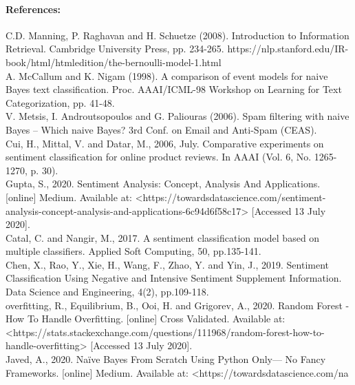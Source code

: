 \documentclass[12pt]{report}
\begin{document}
	
	\paragraph{References:}
	C.D. Manning, P. Raghavan and H. Schuetze (2008). Introduction to Information Retrieval. Cambridge University Press, pp. 234-265. https://nlp.stanford.edu/IR-book/html/htmledition/the-bernoulli-model-1.html\\
	
	A. McCallum and K. Nigam (1998). A comparison of event models for naive Bayes text classification. Proc. AAAI/ICML-98 Workshop on Learning for Text Categorization, pp. 41-48.\\
	
	V. Metsis, I. Androutsopoulos and G. Paliouras (2006). Spam filtering with naive Bayes – Which naive Bayes? 3rd Conf. on Email and Anti-Spam (CEAS).\\
	
	Cui, H., Mittal, V. and Datar, M., 2006, July. Comparative experiments on sentiment classification for online product reviews. In AAAI (Vol. 6, No. 1265-1270, p. 30).\\
	
	Gupta, S., 2020. Sentiment Analysis: Concept, Analysis And Applications. [online] Medium. Available at: <https://towardsdatascience.com/sentiment-analysis-concept-analysis-and-applications-6c94d6f58c17> [Accessed 13 July 2020].\\
	
	Catal, C. and Nangir, M., 2017. A sentiment classification model based on multiple classifiers. Applied Soft Computing, 50, pp.135-141.\\
	
	Chen, X., Rao, Y., Xie, H., Wang, F., Zhao, Y. and Yin, J., 2019. Sentiment Classification Using Negative and Intensive Sentiment Supplement Information. Data Science and Engineering, 4(2), pp.109-118.\\
	
	overfitting, R., Equilibrium, B., Ooi, H. and Grigorev, A., 2020. Random Forest - How To Handle Overfitting. [online] Cross Validated. Available at: <https://stats.stackexchange.com/questions/111968/random-forest-how-to-handle-overfitting> [Accessed 13 July 2020].\\
	
	Javed, A., 2020. Naïve Bayes From Scratch Using Python Only— No Fancy Frameworks. [online] Medium. Available at: <https://towardsdatascience.com/na%
	
	
\end{document}
